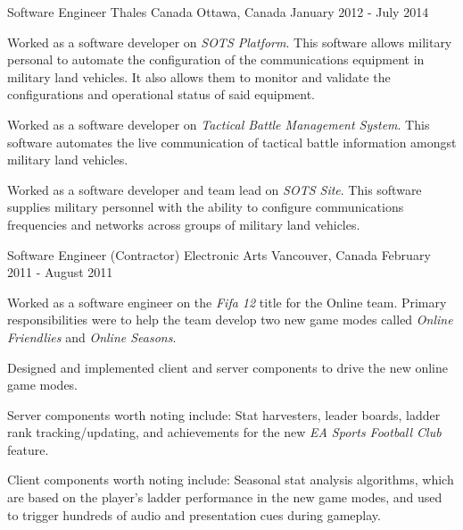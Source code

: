 \begin{cventries}

\cventry
{Software Engineer} %
{Thales Canada} %
{Ottawa, Canada} %
{January 2012 - July 2014} %
{ %
\begin{cvitems}
  \item {Worked as a software developer on \emph{SOTS Platform}. This software allows military personal to automate the configuration of the communications equipment in military land vehicles. It also allows them to monitor and validate the configurations and operational status of said equipment.}
  \item {Worked as a software developer on \emph{Tactical Battle Management System}. This software automates the live communication of tactical battle information amongst military land vehicles.}
  \item {Worked as a software developer and team lead on \emph{SOTS Site}. This software supplies military personnel with the ability to configure communications frequencies and networks across groups of military land vehicles.}
\end{cvitems} 
}


\cventry
{Software Engineer (Contractor)} %
{Electronic Arts} %
{Vancouver, Canada} %
{February 2011 - August 2011} %
{ %
\begin{cvitems}
  \item {Worked as a software engineer on the \emph{Fifa 12} title for the Online team. Primary responsibilities were to help the team develop two new game modes called \emph{Online Friendlies} and \emph{Online Seasons}.}
  \item {Designed and implemented client and server components to drive the new online game modes.}
  \item {Server components worth noting include: Stat harvesters, leader boards, ladder rank tracking/updating, and achievements for the new \emph{EA Sports Football Club} feature.}
  \item {Client components worth noting include: Seasonal stat analysis algorithms, which are based on the player's ladder performance in the new game modes, and used to trigger hundreds of audio and presentation cues during gameplay.}
\end{cvitems}
}


\end{cventries}
